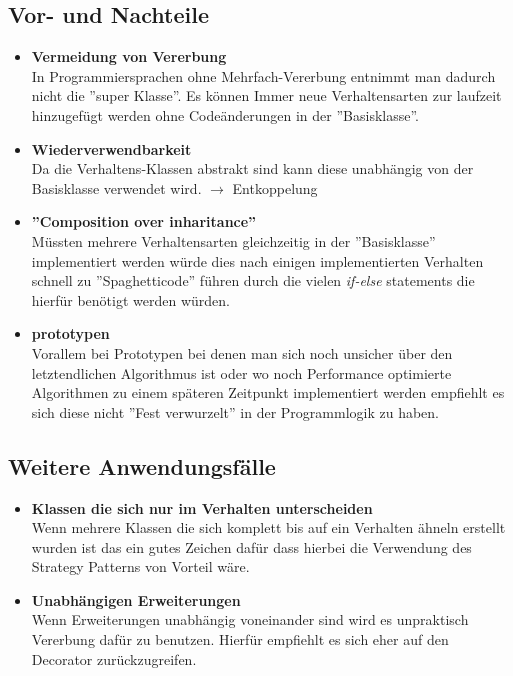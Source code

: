 \subsection{Vor- und Nachteile}
\begin{itemize}
	\item \textbf{Vermeidung von Vererbung} \\ 
	In Programmiersprachen ohne Mehrfach-Vererbung entnimmt man dadurch nicht die ''super Klasse''. Es können Immer neue Verhaltensarten zur laufzeit hinzugefügt werden ohne Codeänderungen in der ''Basisklasse''. 
	\item \textbf{Wiederverwendbarkeit}\\
	Da die Verhaltens-Klassen abstrakt sind kann diese unabhängig von der Basisklasse verwendet wird. $\rightarrow$ Entkoppelung
	\item \textbf{''Composition over inharitance''}\\
	Müssten mehrere Verhaltensarten gleichzeitig in der ''Basisklasse'' implementiert werden würde dies nach einigen implementierten Verhalten schnell zu ''Spaghetticode'' führen durch die vielen \textit{if-else} statements die hierfür benötigt werden würden. 
	\item \textbf{prototypen}\\
	Vorallem bei Prototypen bei denen man sich noch unsicher über den letztendlichen Algorithmus ist oder wo noch Performance optimierte Algorithmen zu einem späteren Zeitpunkt implementiert werden empfiehlt es sich diese nicht ''Fest verwurzelt'' in der Programmlogik zu haben. 
\end{itemize}



\subsection{Weitere Anwendungsfälle}
\begin{itemize}
	\item \textbf{Klassen die sich nur im Verhalten unterscheiden}\\
	Wenn mehrere Klassen die sich komplett bis auf ein Verhalten ähneln erstellt wurden ist das ein gutes Zeichen dafür dass hierbei die Verwendung des Strategy Patterns von Vorteil wäre.
	
	\item \textbf{Unabhängigen Erweiterungen}\\
	Wenn Erweiterungen unabhängig voneinander sind wird es unpraktisch Vererbung dafür zu benutzen. Hierfür empfiehlt es sich eher auf den Decorator zurückzugreifen.
	
\end{itemize}

